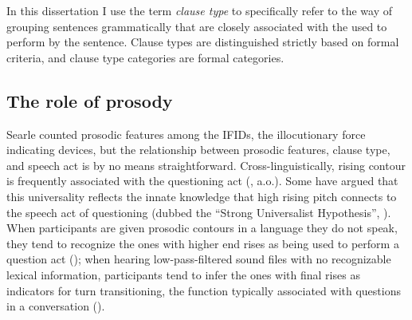 In this dissertation I use the term \emph{clause type} to specifically refer to the way of grouping sentences grammatically that are closely associated with the  used to perform by the sentence. Clause types are distinguished strictly based on formal criteria, and clause type categories are formal categories.  

\subsection{The role of prosody}
\label{sec:bg:theory:prosody}

Searle counted prosodic features among the IFIDs, the illocutionary force indicating devices, but the relationship between prosodic features, clause type, and speech act is by no means straightforward. Cross-linguistically, rising contour is frequently associated with the questioning act (\citealt{bolinger1978, ladd1981, gussenhovenchen2000, ladd2001typology}, a.o.). Some have argued that this universality reflects the innate knowledge that high rising pitch connects to the speech act of questioning (dubbed the ``Strong Universalist Hypothesis'', \cite{ladd1981}). When participants are given prosodic contours in a language they do not speak, they tend to recognize the ones with higher end rises as being used to perform a question act (\cite{gussenhovenchen2000}); when hearing low-pass-filtered sound files with no recognizable lexical information, participants tend to infer the ones with final rises as indicators for turn transitioning, the function typically associated with questions in a conversation (\cite{bogels2015prosodyturn}). 


